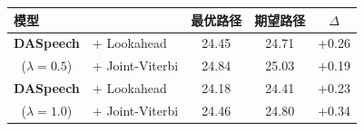 \begin{table}[!htbp]
    \label{tab:daspeech_path}
    \centering
    \small
    \begin{tabular}{llccc}
        \toprule
        \textbf{模型} & & \textbf{最优路径} & \textbf{期望路径} & \textbf{$\Delta$} \\
        \midrule
        \multicolumn{1}{c}{\textbf{DASpeech}} & + Lookahead     & 24.45 & 24.71 & +0.26 \\
        \multicolumn{1}{c}{($\lambda=0.5$)}   & + Joint-Viterbi & 24.84 & 25.03 & +0.19 \\
        \midrule
        \multicolumn{1}{c}{\textbf{DASpeech}} & + Lookahead     & 24.18 & 24.41 & +0.23 \\
        \multicolumn{1}{c}{($\lambda=1.0$)}   & + Joint-Viterbi & 24.46 & 24.80 & +0.34 \\
        \bottomrule
    \end{tabular}
\end{table}
